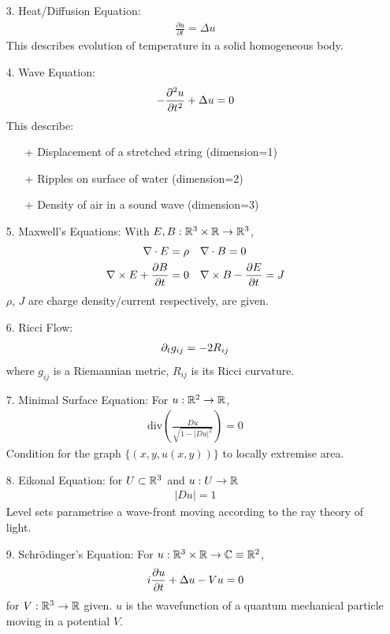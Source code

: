 \documentclass[10pt,a4paper]{report}
\begin{document}
\begin{itemize}
\item[3.] Heat/Diffusion Equation:
\begin{align*}
\frac{\partial u}{\partial t} = \Delta u
\end{align*}
This describes evolution of temperature in a solid homogeneous body.

\item[4.] Wave Equation:
\begin{align*}
-\frac{\partial^2 u}{\partial t^2} + \Delta u =0
\end{align*}
This describe: \begin{itemize}
\item[+] Displacement of a stretched string (dimension=1)
\item[+] Ripples on surface of water (dimension=2)
\item[+] Density of air in a sound wave (dimension=3)
\end{itemize}

\item[5.] Maxwell's Equations:
With $E,B : \mathbb{R}^3 \times \mathbb{R} \rightarrow \mathbb{R}^3$,
\begin{align*}
\nabla \cdot E = \rho & \quad \nabla \cdot B =0 \\
\nabla \times E + \frac{\partial B}{\partial t} =0 & \quad \nabla \times B - \frac{\partial E}{\partial t} = J
\end{align*}
$\rho$, $J$ are charge density/current respectively, are given.

\item[6.] Ricci Flow:
\begin{align*}
\partial_t g_{ij} = -2R_{ij}
\end{align*}
where $g_{ij}$ is a Riemannian metric, $R_{ij}$ is its Ricci curvature.

\item[7.] Minimal Surface Equation:
For $u: \mathbb{R}^2 \rightarrow \mathbb{R}$,
\begin{align*}
\text{div}(\frac{Du}{\sqrt{1-|Du|^2}}) =0
\end{align*}
Condition for the graph $\{ (x,y,u(x,y)) \}$ to locally extremise area.

\item[8.] Eikonal Equation:
for $U\subset \mathbb{R}^3$ and $u:U\rightarrow \mathbb{R}$
\begin{align*}
|Du|=1
\end{align*}
Level sets parametrise a wave-front moving according to the ray theory of light. 

\item[9.] Schr\"{o}dinger's Equation:
For $u:\mathbb{R}^3 \times \mathbb{R} \rightarrow \mathbb{C} \equiv \mathbb{R}^2$,
\begin{align*}
i\frac{\partial u}{\partial t} + \Delta u - Vu =0
\end{align*}
for $V: \mathbb{R}^3\rightarrow \mathbb{R}$ given. $u$ is the wavefunction of a quantum mechanical particle moving in a potential $V$.


\end{itemize}
\end{document}
